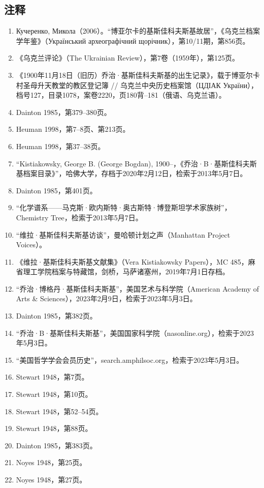 \subsection{注释}
\begin{enumerate}
\item Кучеренко, Микола（2006）。“博亚尔卡的基斯佳科夫斯基故居”，《乌克兰档案学年鉴》（Український археографічний щорічник），第10/11期，第856页。
\item 《乌克兰评论》（The Ukrainian Review），第7卷（1959年），第125页。
\item 《1900年11月18日（旧历）乔治·基斯佳科夫斯基的出生记录》，载于博亚尔卡村圣母升天教堂的教区登记簿 // 乌克兰中央历史档案馆（ЦДІАК України），档号127，目录1078，案卷2220，页180背–181（俄语、乌克兰语）。
\item Dainton 1985，第379–380页。
\item Heuman 1998，第7–8页、第213页。
\item Heuman 1998，第37–38页。
\item “Kistiakowsky, George B. (George Bogdan), 1900–，《乔治·B·基斯佳科夫斯基档案目录》”，哈佛大学，存档于2020年2月12日，检索于2013年5月7日。
\item Dainton 1985，第401页。
\item “化学谱系——马克斯·欧内斯特·奥古斯特·博登斯坦学术家族树”，Chemistry Tree，检索于2013年5月7日。
\item “维拉·基斯佳科夫斯基访谈”，曼哈顿计划之声（Manhattan Project Voices）。
\item 《维拉·基斯佳科夫斯基文献集》（Vera Kistiakowsky Papers），MC 485，麻省理工学院档案与特藏馆，剑桥，马萨诸塞州，2019年7月1日存档。
\item “乔治·博格丹·基斯佳科夫斯基”，美国艺术与科学院（American Academy of Arts & Sciences），2023年2月9日，检索于2023年5月3日。
\item Dainton 1985，第382页。
\item “乔治·B·基斯佳科夫斯基”，美国国家科学院（nasonline.org），检索于2023年5月3日。
\item “美国哲学学会会员历史”，search.amphilsoc.org，检索于2023年5月3日。
\item Stewart 1948，第7页。
\item Stewart 1948，第10页。
\item Stewart 1948，第52–54页。
\item Stewart 1948，第88页。
\item Dainton 1985，第383页。
\item Noyes 1948，第25页。
\item Noyes 1948，第27页。

\end{enumerate}
